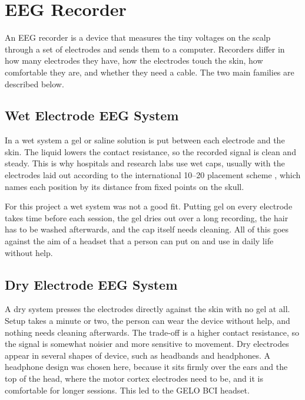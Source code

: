 \section{EEG Recorder}
An EEG recorder is a device that measures the tiny voltages on the scalp through a set of
electrodes and sends them to a computer. Recorders differ in how many electrodes they
have, how the electrodes touch the skin, how comfortable they are, and whether they need a
cable. The two main families are described below.

\subsection{Wet Electrode EEG System}

In a wet system a gel or saline solution is put between each electrode and the skin. The
liquid lowers the contact resistance, so the recorded signal is clean and steady. This is
why hospitals and research labs use wet caps, usually with the electrodes laid out
according to the international 10--20 placement scheme \cite{jasper1958tentwenty}, which
names each position by its distance from fixed points on the skull.

For this project a wet system was not a good fit. Putting gel on every electrode takes
time before each session, the gel dries out over a long recording, the hair has to be
washed afterwards, and the cap itself needs cleaning. All of this goes against the aim of
a headset that a person can put on and use in daily life without help.

\subsection{Dry Electrode EEG System}

A dry system presses the electrodes directly against the skin with no gel at all. Setup
takes a minute or two, the person can wear the device without help, and nothing needs
cleaning afterwards. The trade-off is a higher contact resistance, so the signal is
somewhat noisier and more sensitive to movement. Dry electrodes appear in several shapes
of device, such as headbands and headphones. A headphone design was chosen here, because
it sits firmly over the ears and the top of the head, where the motor cortex electrodes
need to be, and it is comfortable for longer sessions. This led to the GELO BCI headset.

